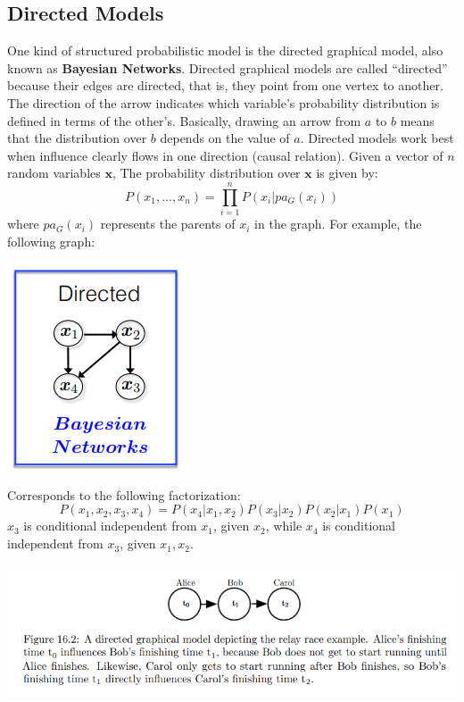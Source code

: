 \subsection{Directed Models}
One kind of structured probabilistic model is the directed graphical model, also known as \textbf{Bayesian Networks}. Directed graphical models are called “directed” because their edges are directed, that is, they point from one vertex to another. The direction of the arrow indicates which variable’s probability distribution is defined in terms of the other’s. Basically, drawing an arrow from
$a$ to $b$ means that the distribution over $b$ depends on the value of $a$. Directed models work best when influence clearly flows in one direction (causal relation).\newline\newline
Given a vector of $n$ random variables $\textbf{x}$, The probability distribution over $\textbf{x}$ is given by:
\[P(x_1, ..., x_n) = \prod_{i=1}^n P(x_i | pa_G(x_i))\]
where $pa_G(x_i)$ represents the parents of $x_i$ in the graph.\newline\newline
For example, the following graph:
\begin{center}
    \includegraphics[]{images/directed graph.png}
\end{center}
Corresponds to the following factorization:
\[P(x_1, x_2, x_3, x_4) = P(x_4|x_1, x_2)P(x_3|x_2)P(x_2|x_1)P(x_1)\]
$x_3$ is conditional independent from $x_1$, given $x_2$, while $x_4$ is conditional independent from $x_3$, given $x_1, x_2$.
\begin{center}
    \includegraphics[scale=0.8]{images/relay race.png}
\end{center}
